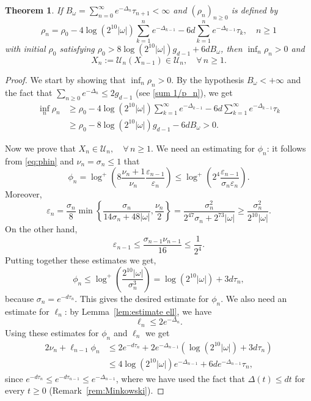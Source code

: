 \documentclass[12pt,reqno,a4paper]{amsart}%
\numberwithin{equation}{section}
\newtheorem{theorem}{Theorem}[section]
\newcommand{\Us}{{\mathscr{U}}}
\newcommand{\UU}{{\mathcal U}}
\begin{document}
\begin{theorem}\label{thm:infrenormalization}
If
$
B_\omega=\sum_{n=0}^{\infty} e^{-\Delta_n}\tau_{n+1}<\infty
$
and $(\rho_n)_{n\geq0}$ is defined by
$$
\rho_n=\rho_{0}-4\log(2^{10}|\omega|)\sum_{k=1}^ne^{-\Delta_{k-1}}-6d\sum_{k=1}^n e^{-\Delta_{k-1}}\tau_k,\quad n\geq1
$$
with initial $\rho_0$ satisfying $\rho_0 > 8\log(2^{10}|\omega|)g_{d-1}+ 6d B_\omega$,  then  $\inf_n\rho_n>0$ and
   $$X_n:=\UU_n(X_{n-1})\in \Us_n,\quad\forall\,n\geq1.$$
\end{theorem}
\begin{proof}
We start by showing that $\inf_n\rho_n>0$.   By the hypothesis $B_\omega<+\infty$ and the fact that $\sum_{n\geq0}e^{-\Delta_n}\leq 2 g_{d-1}$ (see \eqref{sum 1/p_n}), we get
\begin{align*}
\inf_n\rho_n &\geq \rho_{0}-4\log(2^{10}|\omega|)\sum_{k=1}^\infty e^{-\Delta_{k-1}}-6d\sum_{k=1}^\infty e^{-\Delta_{k-1}}\tau_k\\
& \geq \rho_0-8\log(2^{10}|\omega|)g_{d-1}-6d B_\omega>0.
\end{align*}

Now we prove that $X_n \in  \Us_n,\quad\forall\,n\geq1$. We need an estimating for $\phi_n$: it follows from \eqref{eq:phin} and $\nu_n=\sigma_n\leq 1$ that
$$
\phi_n = \log^+\left(8\frac{\nu_n+1}{\nu_n}\frac{\varepsilon_{n-1}}{\varepsilon_n}\right)\leq \log^+\left(2^4\frac{\varepsilon_{n-1}}{\sigma_n\varepsilon_n}\right).
$$ 
Moreover,
$$
\varepsilon_n = \frac{\sigma_{n}}{8}\min\left\{\frac{\sigma_{n}}{14\sigma_{n} + 48|\omega|},\frac{\nu_{n}}2\right\} =\frac{\sigma_{n}^2}{2^47\sigma_{n} + 2^73|\omega|}\geq \frac{\sigma_n^2}{2^{10}|\omega|}.
$$
On the other hand, $$\varepsilon_{n-1}\leq \frac{\sigma_{n-1}\nu_{n-1}}{16}\leq \frac{1}{2^4}.$$ 
Putting together these estimates we get,
$$
\phi_n\leq \log^+\left(\frac{2^{10}|\omega|}{\sigma_n^3}\right) = \log (2^{10}|\omega|) + 3d\tau_n,
$$
because $\sigma_n=e^{-d\tau_n}$.   This gives the desired estimate for $\phi_n$.  We also need an estimate for $\ell_n$:  by Lemma~\ref{lem:estimate ell},  we have 
$$
\ell_{n}\leq 2e^{-\Delta_n}.
$$
Using these estimates for $\phi_n$ and $\ell_n$ we get
\begin{align*}
2\nu_n+\ell_{n-1}\phi_n &\leq 2e^{-d\tau_n} + 2e^{-\Delta_{n-1}}(\log (2^{10}|\omega|) + 3d\tau_n)\\
&\leq 4\log (2^{10}|\omega|)e^{-\Delta_{n-1}} + 6d e^{-\Delta_{n-1}}\tau_n,
\end{align*}
since $e^{-d\tau_n}\leq e^{-d\tau_{n-1}}\leq e^{-\Delta_{n-1}}$, where we have used the fact that $\Delta(t)\leq dt$ for every $t\geq0$ (Remark~\ref{rem:Minkowski}).


\end{proof}
\end{document}
